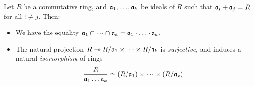\begin{theorem}
\label{thm:chinese-remainder-theorem}
Let \(R\) be a commutative ring, and \(\mathfrak{a}_1, \dots, \mathfrak{a}_k\)
be ideals of \(R\) such that \(\mathfrak{a}_i + \mathfrak{a}_j = R\) for all
\(i \neq j\). Then:
\begin{itemize}\setlength\itemsep{0em}
\item We have the equality \(\mathfrak{a}_1 \cap \dots \cap \mathfrak{a}_k =
  \mathfrak{a}_1 \cdot \ldots \cdot \mathfrak{a}_k\).
\item The natural projection
  \(R \twoheadrightarrow R/\mathfrak{a}_1 \times \dots \times R/\mathfrak{a}_k\) is
  \emph{surjective}, and induces a natural \emph{isomorphism} of rings
  \[
  \frac{R}{\mathfrak{a}_1 \dots \mathfrak{a}_k}
  \simeq (R/\mathfrak{a}_1) \times \dots \times (R/\mathfrak{a}_{k})
  \]
\end{itemize}
\end{theorem}

